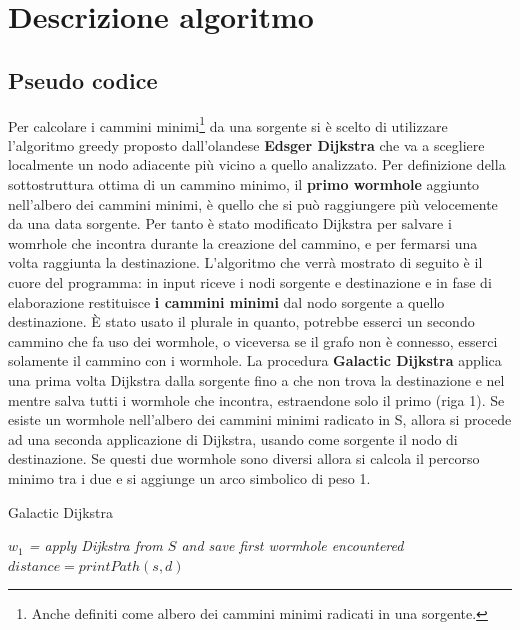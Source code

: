 \def\baselinestretch{1}
\section{Descrizione algoritmo}
\def\baselinestretch{1.66}
\thispagestyle{headings}

\subsection{Pseudo codice}\label{gg}
\indent Per calcolare i cammini minimi\footnote{Anche definiti
come albero dei cammini minimi radicati in una sorgente.} da una sorgente si \`e
scelto di utilizzare l'algoritmo greedy proposto dall'olandese \textbf{Edsger 
Dijkstra} che va a scegliere localmente 
un nodo adiacente pi\`u vicino a quello analizzato. Per
definizione della sottostruttura ottima di un cammino minimo, il
\textbf{primo wormhole} aggiunto nell'albero dei cammini minimi, \`e
quello che si pu\`o raggiungere pi\`u velocemente da una data
sorgente. Per tanto \`e stato modificato Dijkstra per salvare i womrhole che
incontra durante la creazione del cammino, e per fermarsi una volta raggiunta la destinazione.\newline
\indent L'algoritmo che verr\`a mostrato di seguito \`e il cuore
del programma: in input riceve i nodi sorgente e destinazione
e in fase di elaborazione restituisce \textbf{i cammini minimi}
dal nodo sorgente a quello destinazione. \`E stato usato
il plurale in quanto, potrebbe esserci un secondo cammino
che fa uso dei wormhole, o viceversa se il grafo non
\`e connesso, esserci solamente il cammino con i wormhole.\newline
\indent La procedura \textbf{Galactic Dijkstra} applica una prima volta 
Dijkstra dalla sorgente fino a che non trova la
destinazione e nel mentre salva tutti i wormhole che incontra,
estraendone solo il primo (riga 1).
Se esiste un wormhole nell'albero dei cammini minimi radicato in S,
allora si procede ad una seconda applicazione di Dijkstra, usando
come sorgente il nodo di destinazione. Se questi due wormhole
sono diversi allora si calcola il percorso minimo tra i due e si
aggiunge un arco simbolico di peso 1.


\BlankLine
\IncMargin{1.5em}
\begin{algorithm}[H]
\caption{Galactic Dijkstra}
\BlankLine\BlankLine
{}
\BlankLine
\emph{$w_1$ = apply Dijkstra from $S$ and save first wormhole encountered}\;
$distance = printPath(s, d)$\;
\BlankLine
\end{algorithm}
\DecMargin{1em}

